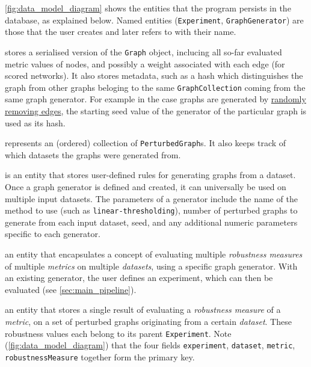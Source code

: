 

\autoref{fig:data_model_diagram} shows the entities that the program persists in the database, as explained below.
Named entities (\texttt{Experiment}, \texttt{GraphGenerator}) are those that the user creates and later refers to with their name.
\begin{description}[itemsep=\zerospace]
    \item[\texttt{PerturbedGraph}]
    stores a serialised version of the \texttt{Graph} object, inclucing all so-far evaluated metric values of nodes, and possibly a weight associated with each edge (for scored networks).
    It also stores metadata, such as a hash which distinguishes the graph from other graphs beloging to the same \texttt{GraphCollection} coming from the same graph generator.
    For example in the case graphs are generated by \hyperref[sec:randomly_removing_edges]{randomly removing edges}, the starting seed value of the generator of the particular graph is used as its hash.

    \item[\texttt{GraphCollection}]
    represents an (ordered) collection of \texttt{PerturbedGraph}s.
    It also keeps track of which datasets the graphs were generated from.

    \item[\texttt{GraphGenerator}]
    is an entity that stores user-defined rules for generating graphs from a dataset.
    Once a graph generator is defined and created, it can universally be used on multiple input datasets.
    The parameters of a generator include the name of the method to use (such as \texttt{linear-thresholding}), number of perturbed graphs to generate from each input dataset, seed, and any additional numeric parameters specific to each generator.

    \item[\texttt{Experiment}]
    an entity that encapsulates a concept of evaluating multiple \textsl{robustness measures} of multiple \textsl{metrics} on multiple \textsl{datasets}, using a specific graph generator.
    With an existing generator, the user defines an experiment, which can then be evaluated (see \autoref{sec:main_pipeline}).

    \item[\texttt{Robustness}]
    an entity that stores a single result of evaluating a \textsl{robustness measure} of a \textsl{metric}, on a set of perturbed graphs originating from a certain \textsl{dataset}.
    These robustness values each belong to its parent \texttt{Experiment}.
    Note (\autoref{fig:data_model_diagram}) that the four fields \texttt{experiment}, \texttt{dataset}, \texttt{metric}, \texttt{robustnessMeasure} together form the primary key.
\end{description}


